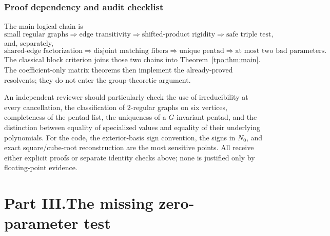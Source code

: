 \documentclass[11pt,letterpaper]{article}
\numberwithin{equation}{section}
\theoremstyle{definition}
\theoremstyle{remark}
\begin{document}
\section{Proof dependency and audit checklist}
\label{tpo:app:audit}

The main logical chain is
\[
 \text{small regular graphs}
 \Longrightarrow \text{edge transitivity}
 \Longrightarrow \text{shifted-product rigidity}
 \Longrightarrow \text{safe triple test},
\]
and, separately,
\[
 \text{shared-edge factorization}
 \Longrightarrow \text{disjoint matching fibers}
 \Longrightarrow \text{unique pentad}
 \Longrightarrow \text{at most two bad parameters}.
\]
The classical block criterion joins those two chains into
Theorem~\ref{tpo:thm:main}. The coefficient-only matrix theorems then implement
the already-proved resolvents; they do not enter the group-theoretic argument.

An independent reviewer should particularly check the use of irreducibility
at every cancellation, the classification of $2$-regular graphs on six
vertices, completeness of the pentad list, the uniqueness of a $G$-invariant
pentad, and the distinction between equality of specialized values and
equality of their underlying polynomials. For the code, the exterior-basis
sign convention, the signs in $N_0$, and exact square/cube-root reconstruction
are the most sensitive points. All receive either explicit proofs or separate
identity checks above; none is justified only by floating-point evidence.


\setcounter{section}{31}
\renewcommand{\thesection}{\arabic{section}}
\makeatletter\gdef{}\gdef{}\makeatother
{}\part*{Part III.\quad The missing zero-parameter test}
\end{document}
